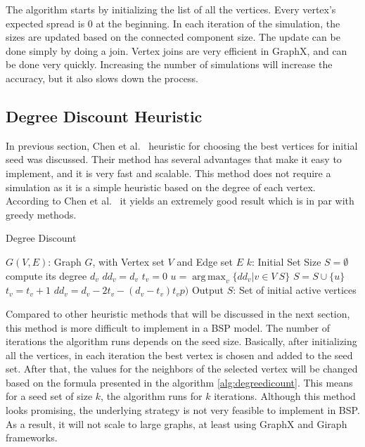 \documentclass[english]{tktltiki}
\DeclareMathOperator*{\argmax}{arg\,max}
\begin{document}
The algorithm starts by initializing the list of all the vertices. 
Every vertex's expected spread is 0 at the beginning. 
In each iteration of the simulation, the sizes are updated based on the connected component size. 
The update can be done simply by doing a join. 
Vertex joins are very efficient in GraphX, and can be done very quickly. 
Increasing the number of simulations will increase the accuracy, but it also slows down the process. 

\subsection{Degree Discount Heuristic}
\label{subsec:degreediscount}
In previous section, Chen et al.\ \cite{chen09} heuristic for choosing the best vertices for initial seed was discussed. 
Their method has several advantages that make it easy to implement, and it is very fast and scalable. 
This method does not require a simulation as it is a simple heuristic based on the degree of each vertex. 
According to Chen et al.\ \cite{chen09} it yields an extremely good result which is in par with greedy methods.
\begin{algorithm}[ht!]
\caption{Degree Discount  \cite{chen09}}
\label{alg:degreedicount}
\begin{algorithmic}
\Require $G(V,E)$: Graph $G$, with Vertex set $V$ and Edge set $E$
\Require $k$: Initial Set Size
\State $S=\emptyset$
	\State compute its degree $d_v$
 	\State $dd_v=d_v$
 	\State $t_v = 0$
\EndFor
{}
	\State $u = \argmax_v \{dd_v |  v \in V \ S\}$
	\State $S = S \cup \{u\}$
		\State $t_v = t_v + 1$
		\State $dd_v = d_v - 2t_v - (d_v - t_v)t_v p)$
	\EndFor
\EndFor
\State Output $S$: Set of initial active vertices
\end{algorithmic}
\end{algorithm}
Compared to other heuristic methods that will be discussed in the next section, this method is more difficult to implement in a BSP model. 
The number of iterations the algorithm runs depends on the seed size. 
Basically, after initializing all the vertices, in each iteration the best vertex is chosen and added to the seed set. 
After that, the values for the neighbors of the selected vertex will be changed based on the formula presented in the algorithm \ref{alg:degreedicount}. 
This means for a seed set of size $k$, the algorithm runs for $k$ iterations. 
Although this method looks promising, the underlying strategy is not very feasible to implement in BSP.
As a result, it will not scale to large graphs, at least using GraphX and Giraph frameworks. 
\end{document}
